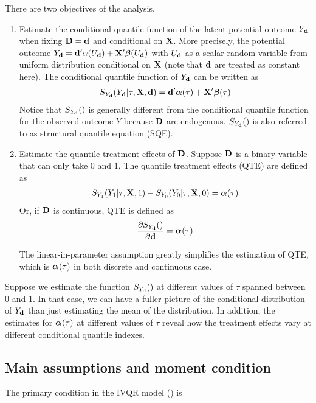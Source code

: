 There are two objectives of the analysis.
\begin{enumerate}

\item Estimate the conditional quantile function of the latent potential outcome
$Y_{\mathbf{d}}$ when fixing $\mathbf{D} = \mathbf{d}$ and conditional on $\mathbf{X}$. More precisely, the
potential outcome $Y_{\mathbf{d}} = \mathbf{d}'\alpha(U_{\mathbf{d}}) + \mathbf{X}'\boldsymbol{\beta}(U_{\mathbf{d}})$ with $U_{\mathbf{d}}$ as a
scalar random variable from uniform distribution conditional on $\mathbf{X}$ (note that
$\mathbf{d}$ are treated as constant here). The conditional quantile function of $Y_{\mathbf{d}}$
can be written as
\begin{align}
S_{Y_{\mathbf{d}}}(Y_{\mathbf{d}} | \tau, \mathbf{X}, \mathbf{d}) = \mathbf{d}'\boldsymbol{\alpha}(\tau) + \mathbf{X}'\boldsymbol{\beta}(\tau)
\end{align}
Notice that $S_{Y_{\mathbf{d}}}()$ is generally different from the conditional quantile
function for the observed outcome $Y$ because $\mathbf{D}$ are endogenous. $S_{Y_{\mathbf{d}}}()$
is also referred to as structural quantile equation (SQE).


\item Estimate the quantile treatment effects of $\mathbf{D}$. Suppose $\mathbf{D}$ is a
binary variable that can only take $0$ and $1$, The quantile treatment
effects (QTE) are defined as 
\begin{align}
S_{Y_1}(Y_1 | \tau, \mathbf{X}, 1) - S_{Y_0}(Y_0 | \tau, \mathbf{X}, 0) = \boldsymbol{\alpha}(\tau)
\end{align}
Or, if $\mathbf{D}$ is continuous, QTE is defined as
\begin{align}
\frac{\partial S_{Y_{\mathbf{d}}}()}{\partial \mathbf{d}} = \boldsymbol{\alpha}(\tau)
\end{align}

The linear-in-parameter assumption greatly simplifies the estimation of QTE, which
is $\boldsymbol{\alpha}(\tau)$ in both discrete and continuous case.  
\end{enumerate}

Suppose we estimate the function $S_{Y_{\mathbf{d}}}()$ at different values of $\tau$
spanned between $0$ and $1$. In that case, we can have a fuller picture of the
conditional distribution of $Y_{\mathbf{d}}$ than just estimating the mean of the
distribution. In addition, the estimates for $\boldsymbol{\alpha}(\tau)$ at different values
of $\tau$ reveal how the treatment effects vary at different conditional
quantile indexes.



	\subsection{Main assumptions and moment condition}
	\label{sec:cond}
The primary condition in the IVQR model (\cite{Chernozhukov2005}) is

